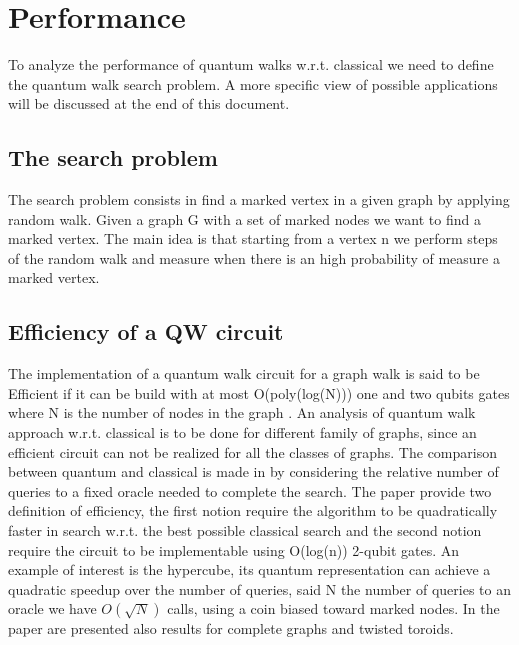 \section{Performance}

To analyze the performance of quantum walks w.r.t. classical we need to define the quantum walk search problem. A more specific view of
possible applications will be discussed at the end of this document. 


\subsection{The search problem}

The search problem consists in find a marked vertex in a given graph by applying random walk. Given a graph G with a set of marked nodes
we want to find a marked vertex. The main idea is that starting from a vertex n we perform steps of the random walk and measure when there is an 
high probability of measure a marked vertex. 


\subsection{Efficiency of a QW circuit}

The implementation of a quantum walk circuit for a graph walk is said to be Efficient 
if it can be build with at most O(poly(log(N))) one and two qubits gates where N is the number of nodes in the graph \cite{douglas2007efficient}. 
An analysis of quantum walk approach w.r.t. classical is to be done for different family of graphs, since an efficient circuit
can not be realized for all the classes of graphs. The comparison between quantum and classical is made in \cite{douglas2014complexity} by 
considering the relative number of queries to a fixed oracle needed to complete the search. The paper provide two definition of 
efficiency, the first notion require the algorithm to be quadratically faster in search w.r.t. the best possible classical search and the 
second notion require the circuit to be implementable using O(log(n)) 2-qubit gates. An example of interest is the hypercube, its quantum representation can
achieve a quadratic speedup over the number of queries, said N the number of queries to an oracle we have $O(\sqrt{N})$ calls, using a coin biased 
toward marked nodes. In the paper are presented also results for complete graphs and twisted toroids.    

